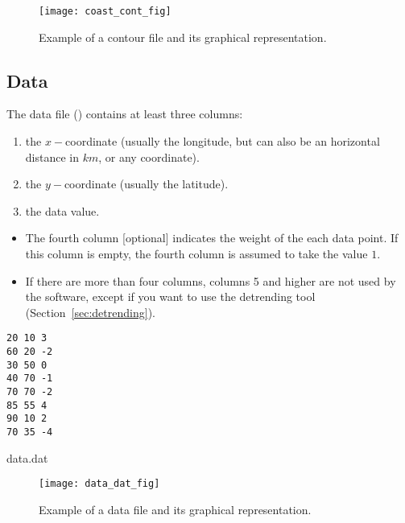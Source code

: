 \begin{figure}[H]
\centering 
\texttt{[image: coast\_cont\_fig]}
\caption{Example of a contour file and its graphical representation.}
\end{figure}

\subsection{Data\label{sec:dataformat}}

The data file () contains at least three columns: 
\begin{enumerate}
\item the $x-$coordinate (usually the longitude, but can also be an horizontal distance in $km$, or any coordinate).
\item the $y-$coordinate (usually the latitude).
\item the data value.
\end{enumerate}
\begin{itemize}
\item The fourth column [optional] indicates the weight of the each data point. If this column is empty, the fourth column is assumed to take the value $1$. 
\item If there are more than four columns, columns 5 and higher are not used by the software, except if you want to use the detrending tool (Section~\ref{sec:detrending}). 
\end{itemize}

\begin{exfile}[htpb]
\begin{footnotesize}
\texttt{20 10 3\\
60 20 -2\\
30 50 0\\
40 70 -1\\
70 70 -2\\
85 55 4\\
90 10 2\\
70 35 -4} 
\end{footnotesize}
\caption{data.dat\label{ex:data.dat}}
\end{exfile}


\begin{figure}[H]
\centering
\texttt{[image: data\_dat\_fig]}
\caption{Example of a data file and its graphical representation.}
\end{figure}





